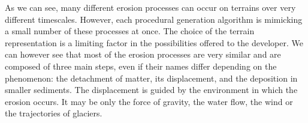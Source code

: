 \midConclusion

As we can see, many different erosion processes can occur on terrains over very different timescales. However, each procedural generation algorithm is mimicking a small number of these processes at once. The choice of the terrain representation is a limiting factor in the possibilities offered to the developer. We can however see that most of the erosion processes are very similar and are composed of three main steps, even if their names differ depending on the phenomenon: the detachment of matter, its displacement, and the deposition in smaller sediments. The displacement is guided by the environment in which the erosion occurs. It may be only the force of gravity, the water flow, the wind or the trajectories of glaciers.
